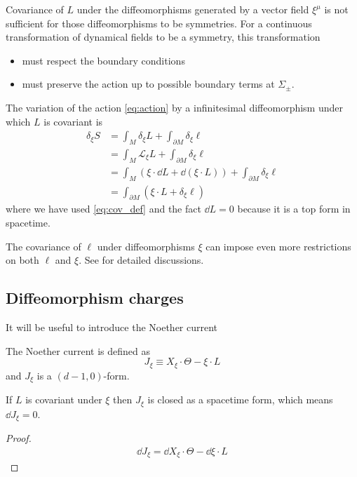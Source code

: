 \documentclass[10pt]{article}
\begin{document}
Covariance of $L$ under the diffeomorphisms generated by a vector field $\xi^\mu$ is not sufficient for those diffeomorphisms to be symmetries.
For a continuous transformation of dynamical fields to be a symmetry, this transformation
\begin{itemize}
    \item must respect the boundary conditions
    \item must preserve the action up to possible boundary terms at $\Sigma_\pm$.
\end{itemize}
The variation of the action \cref{eq:action} by a infinitesimal diffeomorphism under which $L$ is covariant is
\begin{equation}
    \begin{split}
        \delta_\xi S&=\int_M \delta_\xi L+\int_{\partial M}\delta_\xi \ell\\
        &=\int_M \mathcal{L}_\xi L+\int_{\partial M}\delta_\xi \ell\\
        &=\int_M \left(\xi\cdot\dd{L}+\dd(\xi\cdot L)\right)+\int_{\partial M}\delta_\xi \ell\\
        &=\int_{\partial M}\left(\xi\cdot L+\delta_{\xi}\ell\right)
    \end{split}
\end{equation}
where we have used \cref{eq:cov_def} and the fact $\dd{L}=0$ because it is a top form in spacetime.

\begin{remark}
    The covariance of $\ell$ under diffeomorphisms $\xi$ can impose even more restrictions on both $\ell$ and $\xi$.
    See \cite{Harlow:2019yfa} for detailed discussions.
\end{remark}

\subsection{Diffeomorphism charges}

It will be useful to introduce the Noether current\cite{Iyer:1994ys}
\begin{definition}
    The Noether current is defined as
    \begin{equation}
        J_\xi\equiv X_\xi\cdot\Theta-\xi\cdot L
    \end{equation}
    and $J_\xi$ is a $(d-1,0)$-form.
\end{definition}

\begin{claim}
    If $L$ is covariant under $\xi$ then $J_{\xi}$ is closed as a spacetime form, which means $\dd{J_\xi}=0$.
\end{claim}
\begin{proof}
    \begin{equation}
        \begin{split}
            \dd{J_\xi}=\dd{X_\xi\cdot\Theta}-\dd{\xi\cdot L}
        \end{split}
    \end{equation}
\end{proof}
\end{document}
